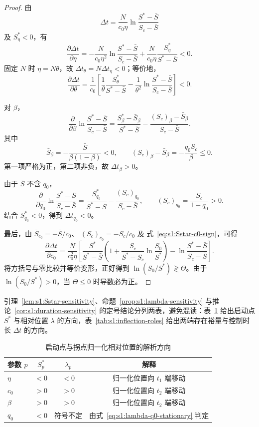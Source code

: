 \documentclass[lang=cn,a4paper,newtx]{elegantpaper}
\numberwithin{equation}{section}
\theoremstyle{plain}
\begin{document}
\begin{proof}
由
\[
\Delta t
=
\frac{N}{c_0\eta}
\ln\frac{S^*-\bar S}{S_c-\bar S}
\]
及 $S^*_\eta<0$，有
\[
\frac{\partial\Delta t}{\partial\eta}
=
-\frac{N}{c_0\eta^2}
\ln\frac{S^*-\bar S}{S_c-\bar S}
+
\frac{N}{c_0\eta}
\frac{S^*_\eta}{S^*-\bar S}
<0.
\]
固定 $N$ 时 $\eta=N\theta$，故
$\Delta t_\theta=N\Delta t_\eta<0$；等价地，
\[
\frac{\partial\Delta t}{\partial\theta}
=
\frac1{c_0}
\left[
\frac1{\theta}
\frac{S^*_\theta}{S^*-\bar S}
-
\frac1{\theta^2}
\ln\frac{S^*-\bar S}{S_c-\bar S}
\right]<0.
\]

对 $\beta$，
\[
\frac{\partial}{\partial\beta}
\ln\frac{S^*-\bar S}{S_c-\bar S}
=
\frac{S^*_\beta-\bar S_\beta}{S^*-\bar S}
-
\frac{(S_c)_\beta-\bar S_\beta}{S_c-\bar S}.
\]
其中
\[
\bar S_\beta
=
-\frac{\bar S}{\beta(1-\beta)}<0,
\qquad
(S_c)_\beta-\bar S_\beta
=
-\frac{q_0S_c}{\beta}\le0.
\]
第一项严格为正，第二项非负，故 $\Delta t_\beta>0$。

由于 $\bar S$ 不含 $q_0$，
\[
\frac{\partial}{\partial q_0}
\ln\frac{S^*-\bar S}{S_c-\bar S}
=
\frac{S^*_{q_0}}{S^*-\bar S}
-
\frac{(S_c)_{q_0}}{S_c-\bar S},
\qquad
(S_c)_{q_0}
=
\frac{S_c}{1-q_0}>0.
\]
结合 $S^*_{q_0}<0$，得到 $\Delta t_{q_0}<0$。

最后，由
$\bar S_{c_0}=-\bar S/c_0$、
$(S_c)_{c_0}=-S_c/c_0$ 及
式~\eqref{eq:s1:Sstar-c0-sign}，可得
\[
\frac{\partial\Delta t}{\partial c_0}
=
\frac{N}{c_0^2\eta}
\left[
\frac{S^*}{S^*-\bar S}
\left(
1+
\frac{S_c}{S^*-S_c}
\ln\frac{S_0}{S^*}
\right)
-
\ln\frac{S^*-\bar S}{S_c-\bar S}
\right].
\]
将方括号与零比较并等价变形，正好得到
$\ln(S_0/S^*)\gtrless\Theta$。由于
$\ln(S_0/S^*)>0$，当 $\Theta\le0$ 时导数必为正。
\end{proof}

引理~\ref{lem:s1:Sstar-sensitivity}、命题~\ref{prop:s1:lambda-sensitivity} 与推论~\ref{cor:s1:duration-sensitivity} 的定号结论分列两表，避免混读：表~\ref{tab:s1:lambda-sensitivity} 给出启动点 $S^*$ 与相对位置 $\lambda$ 的方向，表~\ref{tab:s1:inflection-roles} 给出两端存在裕量与控制时长 $\Delta t$ 的方向。

\begin{table}[htbp]
  \centering
  \footnotesize
  \caption{启动点与拐点归一化相对位置的解析方向}
  \label{tab:s1:lambda-sensitivity}
  \begin{tabular}{lccc}
    \toprule
    参数 $p$ & $S^*_p$ & $\lambda_p$ & 解释\\
    \midrule
    $\eta$  & $<0$ & $<0$ & 归一化位置向 $t_1$ 端移动\\
    $c_0$   & $>0$ & $>0$ & 归一化位置向 $t_2$ 端移动\\
    $\beta$ & $>0$ & $>0$ & 归一化位置向 $t_2$ 端移动\\
    $q_0$   & $<0$ & 符号不定 & 由式~\eqref{eq:s1:lambda-q0-stationary} 判定\\
    \bottomrule
  \end{tabular}
\end{table}
\end{document}
